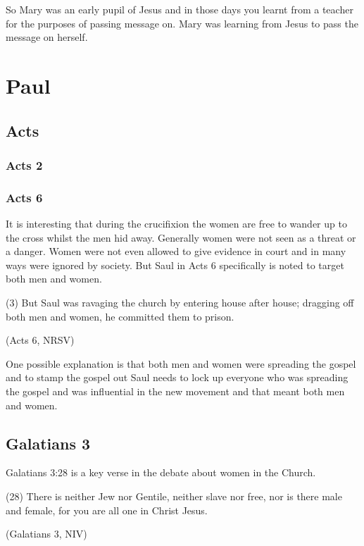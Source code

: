\documentclass[a5paper, openany, oneside, pagesize,
headings=standardclasses, chapterprefix=false]{scrbook}
\begin{document}
So Mary was an early pupil of Jesus and in those days you learnt from
a teacher for the purposes of passing message on. Mary was learning
from Jesus to pass the message on herself.

\section{Paul}

\subsection{Acts}

\subsubsection{Acts 2}

\subsubsection{Acts 6}
It is interesting that during the crucifixion the women are free to
wander up to the cross whilst the men hid away. Generally women were
not seen as a threat or a danger. Women were not even allowed to give
evidence in court and in many ways were ignored by society. But Saul
in Acts 6 specifically is noted to target both men and women.  

\begin{myquote}
(3) But Saul was ravaging the church by entering house after house; dragging off both men and women, he committed them to prison.

(Acts 6, NRSV)
\end{myquote}

One possible explanation is that both men and women were spreading the
gospel and to stamp the gospel out Saul needs to lock up everyone who
was spreading the gospel and was influential in the new movement and
that meant both men and women.


\subsection{Galatians 3}

Galatians 3:28 is a key verse in the debate about women in the Church.

\begin{myquote}

  (28) There is neither Jew nor Gentile, neither slave nor free, nor
  is there male and female, for you are all one in Christ Jesus.

  (Galatians 3, NIV)
  \end{myquote}
\end{document}

